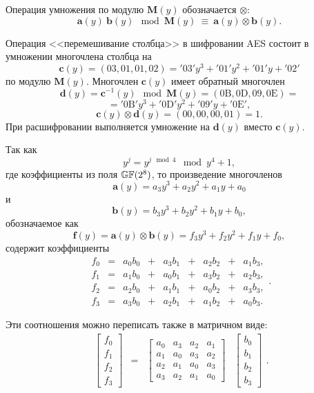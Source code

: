 Операция умножения по модулю $\mathbf{M}(y)$ обозначается $\otimes$:
    \[ \mathbf{a}(y) ~ \mathbf{b}(y) \mod \mathbf{M}(y) ~\equiv~ \mathbf{a}(y) \otimes \mathbf{b}(y). \]

Операция <<перемешивание столбца>> в шифровании AES состоит в умножении многочлена столбца на
    \[ \mathbf{c}(y) = (03, 01, 01, 02) = \mathrm{'03'} y^3 + \mathrm{'01'} y^2 + \mathrm{'01'} y + \mathrm{'02'} \]
по модулю $\mathbf{M}(y)$. Многочлен $\mathbf{c}(y)$ имеет обратный многочлен
    \[ \mathbf{d}(y) = \mathbf{c}^{-1}(y) \mod \mathbf{M}(y) = (\mathrm{0B}, \mathrm{0D}, \mathrm{09}, \mathrm{0E}) = \]
        \[ = \mathrm{'0B'} y^3 + \mathrm{'0D'} y^2 + \mathrm{'09'} y + \mathrm{'0E'}, \]
    \[ \mathbf{c}(y) \otimes \mathbf{d}(y) = (00, 00, 00, 01) = 1. \]
При расшифровании выполняется умножение на $\mathbf{d}(y)$ вместо $\mathbf{c}(y)$.

Так как
    \[ y^j = y^{j \mod 4} \mod y^4+1, \]
где коэффициенты из поля $\mathbb{GF}(2^8)$, то произведение многочленов
    \[ \mathbf{a}(y) = a_{3}y^{3}+ a_{2}y^{2} + a_{1}y + a_{0} \]
и
    \[ \mathbf{b}(y) = b_{3}y^{3} + b_{2}y^{2} + b_{1}y + b_{0}, \]
обозначаемое как
    \[ \mathbf{f}(y) = \mathbf{a}(y) \otimes \mathbf{b}(y) = f_{3}y^{3} + f_{2}y^{2} + f_{1}y + f_{0}, \]
содержит коэффициенты
\[
    \begin{array}{ccccccccc}
        f_{0} & = & a_{0}b_{0} & + & a_{3}b_{1} & + & a_{2}b_{2} & + & a_{1}b_{3}, \\
        f_{1} & = & a_{1}b_{0} & + & a_{0}b_{1} & + & a_{3}b_{2} & + & a_{2}b_{3}, \\
        f_{2} & = & a_{2}b_{0} & + & a_{1}b_{1} & + & a_{0}b_{2} & + & a_{3}b_{3}, \\
        f_{3} & = & a_{3}b_{0} & + & a_{2}b_{1} & + & a_{1}b_{2} & + &  a_{0}b_{3}.
    \end{array}.
\]

Эти соотношения можно переписать также в матричном виде:
\[
    \begin{array}{cccc}
        \left[ \begin{array}{c}
            f_{0} \\
            f_{1} \\
            f_{2} \\
            f_{3}
        \end{array} \right] &  = & \left[\begin{array}{cccc}
            a_{0} & a_{3} & a_{2} & a_{1} \\
            a_{1} & a_{0} & a_{3} & a_{2} \\
            a_{2} & a_{1} & a_{0} & a_{3} \\
            a_{3} & a_{2} & a_{1} & a_{0}
        \end{array}\right] & \left[\begin{array}{c}
            b_{0} \\
            b_{1} \\
            b_{2} \\
            b_{3}
        \end{array} \right]
    \end{array}.
\]

